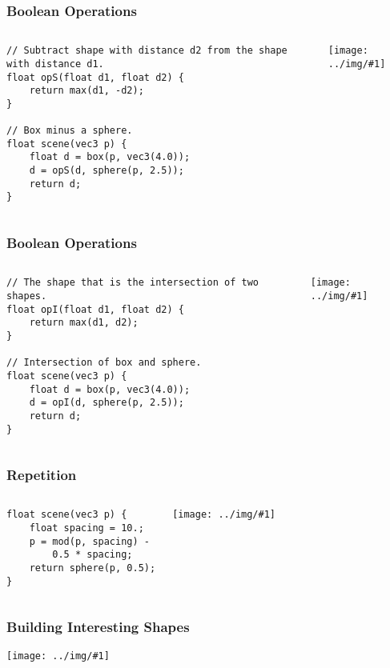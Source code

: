 \documentclass{beamer}
\newcommand\graphic[1]{\texttt{[image: ../img/\#1]}}
\begin{document}
\begin{frame}[fragile]
    \frametitle{Boolean Operations}
    \begin{columns}
        \begin{verbatim}
// Subtract shape with distance d2 from the shape with distance d1.
float opS(float d1, float d2) {
    return max(d1, -d2);
}

// Box minus a sphere.
float scene(vec3 p) {
    float d = box(p, vec3(4.0));
    d = opS(d, sphere(p, 2.5));
    return d;
}
        \end{verbatim}
        \graphic{box-minus-sphere.png}
    \end{columns}
\end{frame}

\begin{frame}[fragile]
    \frametitle{Boolean Operations}
    \begin{columns}
        \begin{verbatim}
// The shape that is the intersection of two shapes.
float opI(float d1, float d2) {
    return max(d1, d2);
}

// Intersection of box and sphere.
float scene(vec3 p) {
    float d = box(p, vec3(4.0));
    d = opI(d, sphere(p, 2.5));
    return d;
}
        \end{verbatim}
        \graphic{box-intersect-sphere.png}
    \end{columns}
\end{frame}

\begin{frame}[fragile]
    \frametitle{Repetition}
    \begin{columns}
        \begin{verbatim}
float scene(vec3 p) {
    float spacing = 10.;
    p = mod(p, spacing) -
        0.5 * spacing;
    return sphere(p, 0.5);
}
        \end{verbatim}
        \graphic{infinite-spheres.png}
    \end{columns}
\end{frame}

\begin{frame}[fragile]
    \frametitle{Building Interesting Shapes}
    \graphic{shading.png}
\end{frame}
\end{document}
